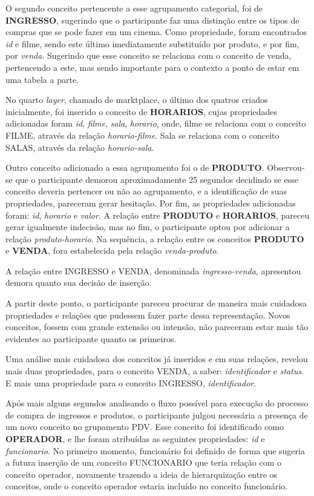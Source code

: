 O segundo conceito pertencente a esse agrupamento categorial, foi de \textbf{INGRESSO}, sugerindo que o participante faz uma distinção entre os tipos de compras que se pode fazer em um cinema. Como propriedade, foram encontrados \textit{id} e filme, sendo este último imediatamente substituído por produto, e por fim, por \textit{venda}. Sugerindo que esse conceito se relaciona com o conceito de venda, pertencendo a este, mas sendo importante para o contexto a ponto de estar em uma tabela a parte.

No quarto \textit{layer}, chamado de marktplace, o último dos quatros criados inicialmente, foi inserido o conceito de \textbf{HORARIOS}, cujas propriedades adicionadas foram \textit{id}, \textit{filme}, \textit{sala}, \textit{horario}, onde, filme se relaciona com o conceito FILME, através da relação \textit{horario-filme}. Sala se relaciona com o conceito SALAS, através da relação \textit{horario-sala}.

Outro conceito adicionado a essa agrupamento foi o de \textbf{PRODUTO}. Observou-se que o participante demorou aproximadamente 25 segundos decidindo se esse conceito deveria pertencer ou não ao agrupamento, e a identificação de suas propriedades, pareceram gerar hesitação. Por fim, as propriedades adicionadas foram: \textit{id}, \textit{horario} e \textit{valor}. A relação entre \textbf{PRODUTO} e \textbf{HORARIOS}, pareceu gerar igualmente indecisão, mas no fim, o participante optou por adicionar a relação \textit{produto-horario}. Na sequência, a relação entre os conceitos \textbf{PRODUTO} e \textbf{VENDA}, fora estabelecida pela relação \textit{venda-produto}. 

A relação entre INGRESSO e VENDA, denominada \textit{ingresso-venda}, apresentou demora quanto sua decisão de inserção.

A partir deste ponto, o participante pareceu procurar de maneira mais cuidadosa propriedades e relações que pudessem fazer parte dessa representação. Novos conceitos, fossem com grande extensão ou intensão, não pareceram estar mais tão evidentes ao participante quanto os primeiros.

Uma análise mais cuidadosa dos conceitos já inseridos e em suas relações, revelou mais duas propriedades, para o conceito VENDA, a saber: \textit{identificador} e \textit{status}. E mais uma propriedade para o conceito INGRESSO, \textit{identificador}. 

Após mais alguns segundos analisando o fluxo possível para execução do processo de compra de ingressos e produtos, o participante julgou necessária a presença de um novo conceito no grupamento PDV. Esse conceito foi identificado como \textbf{OPERADOR}, e lhe foram atribuídas as seguintes propriedades: \textit{id} e \textit{funcionario}. No primeiro momento, funcionário foi definido de forma que sugeria a futura inserção de um conceito FUNCIONARIO que teria relação com o conceito operador, novamente trazendo a ideia de hierarquização entre os conceitos, onde o conceito operador estaria incluído no conceito funcionário.

